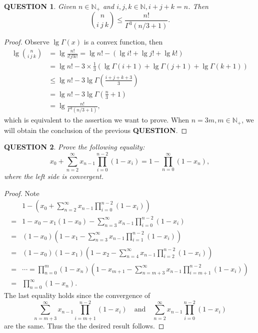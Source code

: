 \documentclass[12pt]{article}
\renewcommand{\(}{\left(}%
\renewcommand{\)}{\right)}%
\renewcommand{\[}{\left[}%
\renewcommand{\]}{\right]}%
\newcommand{\n}{\mathbb{N}}
\newtheorem{question}{QUESTION}[section]}
\newtheorem{proof}{Proof.}}
\begin{document}
  \begin{question}
  	Given $n\in\n_+$ and $i,j,k\in\n,i+j+k=n$. Then 
  	\begin{equation*}
  		\binom{n}{i\ j\ k}\leq \frac{n!}{\Gamma^3(n/3+1)} .
  	\end{equation*}
  \end{question}
  \begin{proof}
  	Observe $\lg\Gamma(x)$ is a convex function, then
  	\begin{equation*}
  		\begin{split}
  			\lg \binom{n}{i\ j\ k}&=\lg \frac{n!}{i!j!k!}=\lg n!-(\lg i!+\lg j!+\lg k!)\\
  			&=\lg n!-3\times\frac{1}{3} (\lg \Gamma(i+1) +\lg \Gamma(j+1)+\lg \Gamma(k+1))\\
  			&\leq \lg n!-3\lg\Gamma(\frac{i+j+k+3}{3} )\\
  			&=\lg n!-3\lg\Gamma(\frac{n}{3}+1 )\\
  			&=\lg \frac{n!}{\Gamma^3(n/3+1)},
  		\end{split}
  	\end{equation*}
  	which is equivalent to the assertion we want to prove. When $n=3m,m\in\n_+$, we will obtain the conclusion of the previous {\bfseries QUESTION}.
  \end{proof}
  
  \begin{question}
  	Prove the following equality:
  	\begin{equation*}
  		x_0+\sum_{n=2}^\infty x_{n-1}\prod_{i=0}^{n-2}(1-x_i)=1-\prod_{n=0}^\infty (1-x_n),
  	\end{equation*}
  	where the left side is convergent.
  \end{question}
  \begin{proof}
  	Note
  	\begin{equation*}
  		\begin{split}
  			&1-\(x_0+\sum_{n=2}^\infty x_{n-1}\prod_{i=0}^{n-2}(1-x_i)\)\\
  			=&1-x_0-x_1(1-x_0)-\sum_{n=3}^\infty x_{n-1}\prod_{i=0}^{n-2}(1-x_i)\\
  			=&(1-x_0)\(1-x_1-\sum_{n=3}^\infty x_{n-1}\prod_{i=1}^{n-2}(1-x_i)\)\\
  			=&(1-x_0)(1-x_1)\(1-x_2-\sum_{n=4}^\infty x_{n-1}\prod_{i=2}^{n-2}(1-x_i)\)\\
  			=&\cdots =\prod_{n=0}^m (1-x_n)\(1-x_{m+	1}-\sum_{n=m+3}^\infty x_{n-1}\prod_{i=m+1}^{n-2}(1-x_i)\) \\
  			=&\prod_{n=0}^\infty (1-x_n).
  		\end{split}
  	\end{equation*}
  	The last equality holds since the convergence of 
  	\begin{equation*}
  		\sum_{n=m+3}^\infty x_{n-1}\prod_{i=m+1}^{n-2}(1-x_i) \quad \text{and}\quad \sum_{n=2}^\infty x_{n-1}\prod_{i=0}^{n-2}(1-x_i)
  	\end{equation*}
  	are the same. Thus the the desired result follows.
  \end{proof}
  
\end{document}
